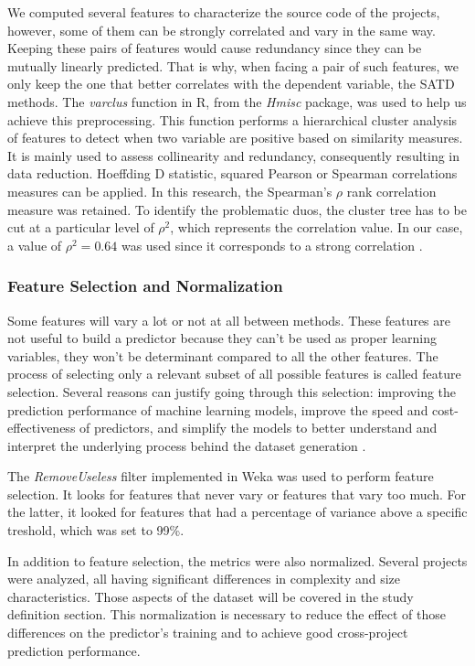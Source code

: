 We computed several features to characterize the source code of the projects, however, some of them can be strongly correlated and vary in the same way. Keeping these pairs of features would cause redundancy since they can be mutually linearly predicted. That is why, when facing a pair of such features, we only keep the one that better correlates with the dependent variable, the \ac{SATD} methods. The \emph{varclus} function in R, from the \emph{Hmisc} package, was used to help us achieve this preprocessing. This function performs a hierarchical cluster analysis of features to detect when two variable are positive based on similarity measures. It is mainly used to assess collinearity and redundancy, consequently resulting in data reduction. Hoeffding D statistic, squared Pearson or Spearman correlations measures can be applied. In this research, the Spearman's $\rho$ rank correlation measure was retained. To identify the problematic duos, the cluster tree has to be cut at a particular level of $\rho^2$, which represents the correlation value. In our case, a value of $\rho^2=0.64$ was used since it corresponds to a strong correlation \citep{Cohen-1988}.

\subsubsection{Feature Selection and Normalization}

Some features will vary a lot or not at all between methods. These features are not useful to build a predictor because they can't be used as proper learning variables, they won't be determinant compared to all the other features. The process of selecting only a relevant subset of all possible features is called feature selection. Several reasons can justify going through this selection: improving the prediction performance of machine learning models, improve the speed and cost-effectiveness of predictors, and simplify the models to better understand and interpret the underlying process behind the dataset generation \citep{guyon2003introduction}. \par 

The \emph{RemoveUseless} filter implemented in Weka \citep{hall2009weka} was used to perform feature selection. It looks for features that never vary or features that vary too much. For the latter, it looked for features that had a percentage of variance above a specific treshold, which was set to 99\%. \par 

In addition to feature selection, the metrics were also normalized. Several projects were analyzed, all having significant differences in complexity and size characteristics. Those aspects of the dataset will be covered in the study definition section. This normalization is necessary to reduce the effect of those differences on the predictor's training and to achieve good cross-project prediction performance.

